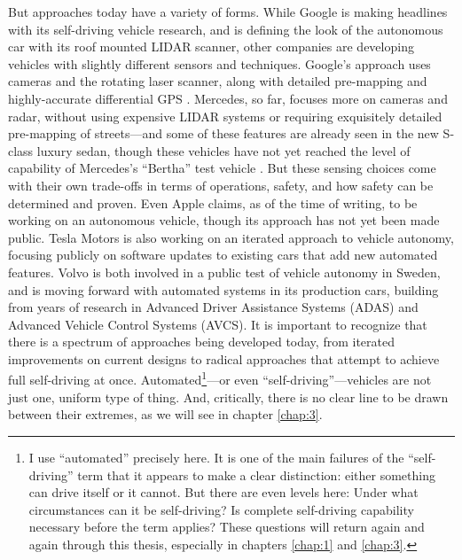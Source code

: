 But approaches today have a variety of forms. While Google is making
headlines with its self-driving vehicle research, and is defining the
look of the autonomous car with its roof mounted LIDAR scanner, other
companies are developing vehicles with slightly different sensors and
techniques. Google's approach uses cameras and the rotating laser
scanner, along with detailed pre-mapping and highly-accurate
differential GPS \cite{guizzoHow}. Mercedes, so far, focuses more on
cameras and radar, 
without using expensive LIDAR systems or requiring exquisitely
detailed pre-mapping of streets---and some of these features are
already seen in the new S-class luxury sedan, though these vehicles
have not yet reached the level of capability of Mercedes's ``Bertha''
test vehicle \cite{makingBertha}. But these sensing choices come with their own
trade-offs in terms of operations, safety, and how safety can be
determined and proven. Even Apple claims, as of the time of writing,
to be working on an autonomous vehicle, though its approach has not
yet been made public. Tesla Motors is also working on an iterated
approach to vehicle autonomy, focusing publicly on software updates to
existing cars that add new automated features. Volvo is both involved
in a public test of vehicle autonomy in Sweden, and is moving forward
with automated systems in its production cars, building from years of
research in Advanced Driver Assistance Systems (ADAS) and Advanced
Vehicle Control Systems (AVCS). It is important to recognize that
there is a spectrum of approaches being developed today, from iterated
improvements on current designs to radical approaches that attempt to
achieve full self-driving at once. Automated\footnote{I use ``automated''
  precisely here. It is one of the main failures of the
  ``self-driving'' term that it appears to make a clear distinction: 
  either something can drive itself or it cannot. But there are even
  levels here: Under what circumstances can it be self-driving? Is
  complete self-driving capability necessary before the term applies?
  These questions will return again and again through this thesis,
  especially in chapters \ref{chap:1} and \ref{chap:3}. }---or even
``self-driving''---vehicles are not just one, uniform type of
thing. And, critically, there is no clear
line to be drawn between their extremes, as we will see in chapter
\ref{chap:3}. 




